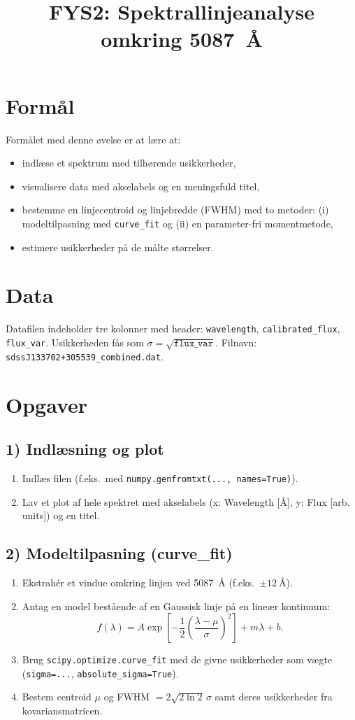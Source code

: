 \documentclass[11pt,a4paper]{article}
\title{FYS2: Spektrallinjeanalyse omkring \SI{5087}{\angstrom}}
\author{}
\date{}
\begin{document}
\maketitle

\section*{Formål}
Formålet med denne øvelse er at lære at:
\begin{itemize}
  \item indlæse et spektrum med tilhørende usikkerheder,
  \item visualisere data med akse\-labels og en meningsfuld titel,
  \item bestemme en linjecentroid og linjebredde (FWHM) med to metoder:
  (i) modeltilpasning med \texttt{curve\_fit} og (ii) en parameter-fri momentmetode,
  \item estimere usikkerheder på de målte størrelser.
\end{itemize}

\section*{Data}
Datafilen indeholder tre kolonner med header:
\texttt{wavelength}, \texttt{calibrated\_flux}, \texttt{flux\_var}.
Usikkerheden fås som $\sigma=\sqrt{\texttt{flux\_var}}$.
Filnavn: \texttt{sdssJ133702+305539\_combined.dat}.

\section*{Opgaver}
\subsection*{1) Indlæsning og plot}
\begin{enumerate}
\item Indlæs filen (f.eks.\ med \texttt{numpy.genfromtxt(..., names=True)}).
\item Lav et plot af hele spektret med akse\-labels (x: Wavelength [\si{\angstrom}], y: Flux [arb. units]) og en titel.
\end{enumerate}

\subsection*{2) Modeltilpasning (curve\_fit)}
\begin{enumerate}
\item Ekstrahér et vindue omkring linjen ved \SI{5087}{\angstrom} (f.eks.\ $\pm\SI{12}{\angstrom}$).
\item Antag en model bestående af en Gaussisk linje på en lineær kontinuum: 
\[ f(\lambda) = A \exp\!\left[-\frac{1}{2}\left(\frac{\lambda-\mu}{\sigma}\right)^2\right] + m \lambda + b. \]
\item Brug \texttt{scipy.optimize.curve\_fit} med de givne usikkerheder som vægte (\texttt{sigma=...}, \texttt{absolute\_sigma=True}).
\item Bestem centroid $\mu$ og FWHM $= 2\sqrt{2\ln 2}\,\sigma$ samt deres usikkerheder fra kovariansmatricen.
\end{enumerate}
\end{document}
